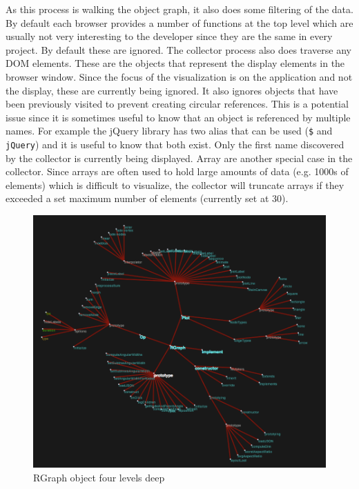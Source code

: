\documentclass[]{article}
\begin{document}
As this process is walking the object graph, it also does some filtering of the data. By default each browser provides a number of functions at the top level which are usually not very interesting to the developer since they are the same in every project. By default these are ignored. The collector process also does traverse any DOM elements. These are the objects that represent the display elements in the browser window. Since the focus of the visualization is on the application and not the display, these are currently being ignored. It also ignores objects that have been previously visited to prevent creating circular references. This is a potential issue since it is sometimes useful to know that an object is referenced by multiple names. For example the jQuery library \cite{jquery} has two alias that can be used ({\tt \$} and {\tt jQuery}) and it is useful to know that both exist. Only the first name discovered by the collector is currently being displayed. Array are another special case in the collector. Since arrays are often used to hold large amounts of data (e.g. 1000s of elements) which is difficult to visualize, the collector will truncate arrays if they exceeded a set maximum number of elements (currently set at 30).



\begin{figure}[h]
  \begin{center}
    \includegraphics[scale=.35]{rgraph.png}
  \end{center}
  \caption{RGraph object four levels deep}
  \label{fig:rgraph}
\end{figure}
\end{document}
